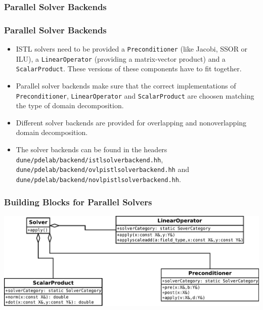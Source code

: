 \subsubsection{Parallel Solver Backends}
\begin{frame}
  \frametitle<presentation>{Parallel Solver Backends}

\begin{itemize}
\item ISTL solvers need to be provided a \lstinline!Preconditioner! (like Jacobi, SSOR or ILU), a 
\lstinline!LinearOperator! (providing a matrix-vector product) and
a \lstinline!ScalarProduct!. These versions of these components have to fit together.
\item Parallel solver backends make sure that the correct implementations of 
\lstinline!Preconditioner!, \lstinline!LinearOperator! and \lstinline!ScalarProduct!
are choosen matching the type of domain decomposition.
\item Different solver backends are provided for overlapping and nonoverlapping domain
decomposition.
\item The solver backends can be found in the headers \lstinline!dune/pdelab/backend/istlsolverbackend.hh!,
\lstinline!dune/pdelab/backend/ovlpistlsolverbackend.hh! and
\lstinline!dune/pdelab/backend/novlpistlsolverbackend.hh!.
\end{itemize}

\end{frame}

\begin{frame}
  \frametitle<presentation>{Building Blocks for Parallel Solvers}
  \includegraphics[width=\textwidth]{EPS/istlsolver}
\end{frame}


